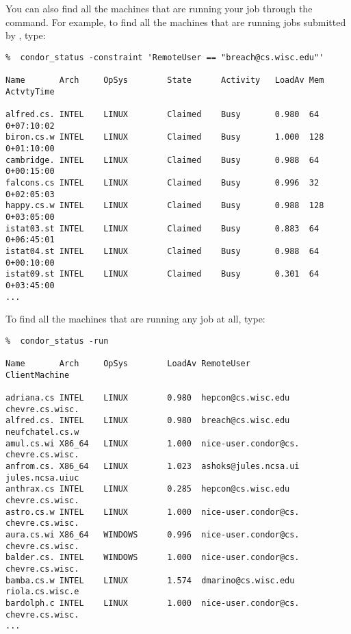 You can also find all the machines that are running your job through the
 command.
For example, to find all the machines that are
running jobs submitted by , type:
\footnotesize
\begin{verbatim}
%  condor_status -constraint 'RemoteUser == "breach@cs.wisc.edu"'

Name       Arch     OpSys        State      Activity   LoadAv Mem  ActvtyTime

alfred.cs. INTEL    LINUX        Claimed    Busy       0.980  64    0+07:10:02
biron.cs.w INTEL    LINUX        Claimed    Busy       1.000  128   0+01:10:00
cambridge. INTEL    LINUX        Claimed    Busy       0.988  64    0+00:15:00
falcons.cs INTEL    LINUX        Claimed    Busy       0.996  32    0+02:05:03
happy.cs.w INTEL    LINUX        Claimed    Busy       0.988  128   0+03:05:00
istat03.st INTEL    LINUX        Claimed    Busy       0.883  64    0+06:45:01
istat04.st INTEL    LINUX        Claimed    Busy       0.988  64    0+00:10:00
istat09.st INTEL    LINUX        Claimed    Busy       0.301  64    0+03:45:00
...
\end{verbatim}
\normalsize
To find all the machines that are running any job at all, type:
\footnotesize
\begin{verbatim}
%  condor_status -run

Name       Arch     OpSys        LoadAv RemoteUser           ClientMachine  

adriana.cs INTEL    LINUX        0.980  hepcon@cs.wisc.edu   chevre.cs.wisc.
alfred.cs. INTEL    LINUX        0.980  breach@cs.wisc.edu   neufchatel.cs.w
amul.cs.wi X86_64   LINUX        1.000  nice-user.condor@cs. chevre.cs.wisc.
anfrom.cs. X86_64   LINUX        1.023  ashoks@jules.ncsa.ui jules.ncsa.uiuc
anthrax.cs INTEL    LINUX        0.285  hepcon@cs.wisc.edu   chevre.cs.wisc.
astro.cs.w INTEL    LINUX        1.000  nice-user.condor@cs. chevre.cs.wisc.
aura.cs.wi X86_64   WINDOWS      0.996  nice-user.condor@cs. chevre.cs.wisc.
balder.cs. INTEL    WINDOWS      1.000  nice-user.condor@cs. chevre.cs.wisc.
bamba.cs.w INTEL    LINUX        1.574  dmarino@cs.wisc.edu  riola.cs.wisc.e
bardolph.c INTEL    LINUX        1.000  nice-user.condor@cs. chevre.cs.wisc.
...
\end{verbatim}
\normalsize

